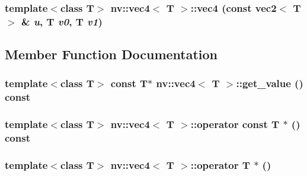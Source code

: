 \hypertarget{classnv_1_1vec4_b62d37042a2dcf73249ac20464b64d84}{
\subsubsection[{vec4}]{\setlength{\rightskip}{0pt plus 5cm}template$<$class T$>$ {\bf nv::vec4}$<$ T $>$::{\bf vec4} (const {\bf vec2}$<$ T $>$ \& {\em u}, \/  T {\em v0}, \/  T {\em v1})}}
\label{classnv_1_1vec4_b62d37042a2dcf73249ac20464b64d84}




\subsection{Member Function Documentation}
\hypertarget{classnv_1_1vec4_4bc644b550faad02d634cc5677309730}{
\subsubsection[{get\_\-value}]{\setlength{\rightskip}{0pt plus 5cm}template$<$class T$>$ const T$\ast$ {\bf nv::vec4}$<$ T $>$::get\_\-value () const}}
\label{classnv_1_1vec4_4bc644b550faad02d634cc5677309730}


\hypertarget{classnv_1_1vec4_084885a396bb36727440eed8ba536270}{
\subsubsection[{operator const T $\ast$}]{\setlength{\rightskip}{0pt plus 5cm}template$<$class T$>$ {\bf nv::vec4}$<$ T $>$::operator const T $\ast$ () const}}
\label{classnv_1_1vec4_084885a396bb36727440eed8ba536270}


\hypertarget{classnv_1_1vec4_06247a6ebeac641b86f522f4ba13e425}{
\subsubsection[{operator T $\ast$}]{\setlength{\rightskip}{0pt plus 5cm}template$<$class T$>$ {\bf nv::vec4}$<$ T $>$::operator T $\ast$ ()}}
\label{classnv_1_1vec4_06247a6ebeac641b86f522f4ba13e425}


